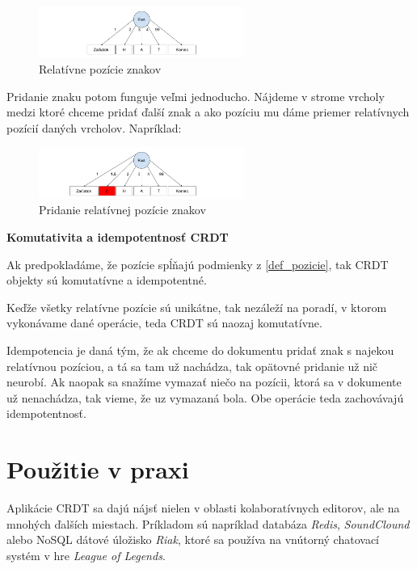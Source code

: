 \begin{figure}[H]
\centerline{\includegraphics[width=0.6\textwidth]{images/relativne_pozicie1}}
\caption[Relatívne pozície znakov]{Relatívne pozície znakov}
\label{obr:relativne}
\end{figure}

Pridanie znaku potom funguje veľmi jednoducho. Nájdeme v strome vrcholy medzi ktoré
chceme pridať ďalší znak a ako pozíciu mu dáme priemer relatívnych pozícií daných
vrcholov. Napríklad:
\begin{figure}[H]
\centerline{\includegraphics[width=0.6\textwidth]{images/relativne_pozicie2}}
\caption[Pridanie relatívnej pozície znakov]{Pridanie relatívnej pozície znakov}
\label{obr:relativne_pridanie}
\end{figure}

\begin{flushleft}\textbf {Komutativita a idempotentnosť CRDT}\end{flushleft}
Ak predpokladáme, že pozície spĺňajú podmienky z \ref{def_pozicie}, tak CRDT objekty sú
komutatívne a idempotentné. 

Keďže všetky relatívne pozície sú unikátne, tak nezáleží na poradí, v ktorom vykonávame dané operácie,
teda CRDT sú naozaj komutatívne.

Idempotencia je daná tým, že ak chceme do dokumentu pridať znak s najekou relatívnou pozíciou, a tá
sa tam už nachádza, tak opätovné pridanie už nič neurobí. Ak naopak sa snažíme vymazať niečo na
pozícii, ktorá sa v dokumente už nenachádza, tak vieme, že uz vymazaná bola. Obe operácie teda
zachovávajú idempotentnosť.
\cite{nuno_preguica}

\section{Použitie v praxi}
Aplikácie CRDT sa dajú nájsť nielen v oblasti kolaboratívnych editorov, ale na mnohých ďalších
miestach. Príkladom sú napríklad databáza \textit{Redis}, \textit{SoundClound} alebo NoSQL 
dátové úložisko \textit{Riak}, ktoré sa používa na vnútorný chatovací systém v hre 
\textit{League of Legends}.
\cite{crdt_wiki}

